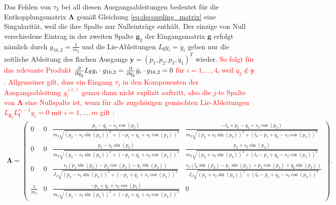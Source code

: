 Das Fehlen von $\tau_2$ bei all diesen Ausgangsableitungen bedeutet für die Entkopplungsmatrix $\boldsymbol{\Lambda}$ gemäß Gleichung \eqref{eq:decoupling_matrix} eine Singularität, weil die ihre Spalte nur Nulleinträge enthält. Der einzige von Null verschiedene Eintrag in der zweiten Spalte $\mathbf{g}_2$ der Eingangsmatrix $\mathbf{g}$ erfolgt nämlich durch $g_{10, 2} = \frac{1}{m_3}$ und die Lie-Ableitungen $L_{\mathbf{f}} y_i = \dot{y}_i$ geben nur die zeitliche Ableitung des flachen Ausgangs $\dot{\mathbf{y}} = (\dot{p}_1, \dot{p}_2, \dot{p}_3, \dot{q}_1)^T$ wieder. \textcolor{red}{So folgt für das relevante Produkt $\frac{\partial^{}}{\partial{\dot{q}_2}^{}} L_{\mathbf{f}} y_i \cdot g_{10, 2} = \frac{\partial^{}}{\partial{\dot{q}_2}^{}} \dot{y}_i \cdot g_{10, 2} = 0$ für $i = 1,..., 4$, weil $\dot{q}_2 \not\in \dot{\mathbf{y}}$. Allgemeiner gilt, dass ein Eingang $\tau_j$ in den Komponenten der Ausgangsableitung $y_i^{(r_i)}$ genau dann nicht explizit auftritt, also die $j$-te Spalte von $\boldsymbol{\Lambda}$ eine Nullspalte ist, wenn für alle zugehörigen gemischten Lie-Ableitungen $L_{\mathbf{g}_j} L_{\mathbf{f}}^{r_i-1} y_i = 0$ mit $i = 1, ..., m$ gilt \cite[S. 201]{NLRT_Roebenack}:}
\begin{align}
	\boldsymbol{\Lambda} = 
	\left(\begin{smallmatrix}
		0 & 0 & \frac{p_{1} - q_{1} - s_{2} \cos{\left(p_{3} \right)}}{m_{2} \sqrt{\left(p_{2} - s_{2} \sin{\left(p_{3} \right)}\right)^{2} + \left(- p_{1} + q_{1} + s_{2} \cos{\left(p_{3} \right)}\right)^{2}}} & \frac{- l_{0} + p_{1} - q_{2} + s_{2} \cos{\left(p_{3} \right)}}{m_{2} \sqrt{\left(p_{2} + s_{2} \sin{\left(p_{3} \right)}\right)^{2} + \left(l_{0} - p_{1} + q_{2} - s_{2} \cos{\left(p_{3} \right)}\right)^{2}}}\\
		0 & 0 & \frac{p_{2} - s_{2} \sin{\left(p_{3} \right)}}{m_{2} \sqrt{\left(p_{2} - s_{2} \sin{\left(p_{3} \right)}\right)^{2} + \left(- p_{1} + q_{1} + s_{2} \cos{\left(p_{3} \right)}\right)^{2}}} & \frac{p_{2} + s_{2} \sin{\left(p_{3} \right)}}{m_{2} \sqrt{\left(p_{2} + s_{2} \sin{\left(p_{3} \right)}\right)^{2} + \left(l_{0} - p_{1} + q_{2} - s_{2} \cos{\left(p_{3} \right)}\right)^{2}}}\\
		0 & 0 & \frac{s_{2} \left(p_{1} \sin{\left(p_{3} \right)} - p_{2} \cos{\left(p_{3} \right)} - q_{1} \sin{\left(p_{3} \right)}\right)}{J_{2} \sqrt{\left(p_{2} - s_{2} \sin{\left(p_{3} \right)}\right)^{2} + \left(- p_{1} + q_{1} + s_{2} \cos{\left(p_{3} \right)}\right)^{2}}} & \frac{s_{2} \left(l_{0} \sin{\left(p_{3} \right)} - p_{1} \sin{\left(p_{3} \right)} + p_{2} \cos{\left(p_{3} \right)} + q_{2} \sin{\left(p_{3} \right)}\right)}{J_{2} \sqrt{\left(p_{2} + s_{2} \sin{\left(p_{3} \right)}\right)^{2} + \left(l_{0} - p_{1} + q_{2} - s_{2} \cos{\left(p_{3} \right)}\right)^{2}}}\\
		\frac{1}{m_{1}} & 0 & \frac{- p_{1} + q_{1} + s_{2} \cos{\left(p_{3} \right)}}{m_{1} \sqrt{\left(p_{2} - s_{2} \sin{\left(p_{3} \right)}\right)^{2} + \left(- p_{1} + q_{1} + s_{2} \cos{\left(p_{3} \right)}\right)^{2}}} & 0
	\end{smallmatrix}\right) .
\end{align}

